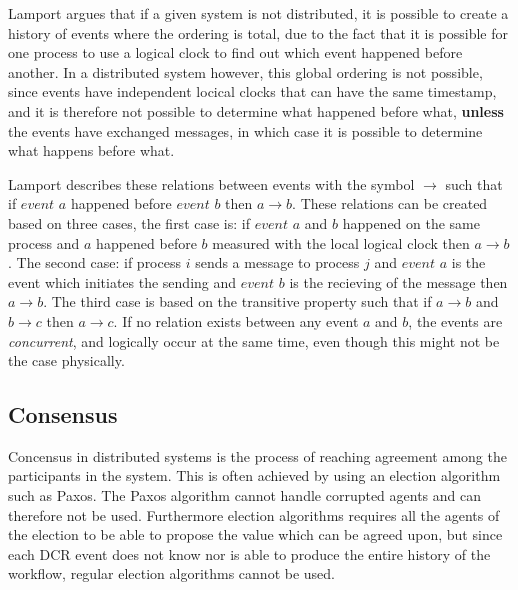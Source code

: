 		\newpar Lamport argues that if a given system is not distributed, it is possible to create a history of events where the ordering is total, due to the fact that it is possible for one process to use a logical clock to find out which event happened before another. In a distributed system however, this global ordering is not possible, since events have independent locical clocks that can have the same timestamp, and it is therefore not possible to determine what happened before what, \textbf{unless} the events have exchanged messages, in which case it is possible to determine what happens before what.
		
		\newpar Lamport describes these relations between events with the symbol $\rightarrow$ such that if $event$ $a$ happened before $event$ $b$ then $a \rightarrow b$. These relations can be created based on three cases, the first case is: if $event$ $a$ and $b$ happened on the same process and $a$ happened before $b$ measured with the local logical clock then $a \rightarrow b$. The second case: if process $i$ sends a message to process $j$ and $event$ $a$ is the event which initiates the sending and $event$ $b$ is the recieving of the message then $a \rightarrow b$. The third case is based on the transitive property such that if $a \rightarrow b$ and $b \rightarrow c$ then $a \rightarrow c$. If no relation exists between any event $a$ and $b$, the events are \textit{concurrent}, and logically  occur at the same time, even though this might not be the case physically. 
		
		
		\subsection{Consensus}
		Concensus in distributed systems is the process of reaching agreement among the participants in the system. This is often achieved by using an election algorithm such as Paxos\cite{Lamport:1998:PP:279227.279229}. The Paxos algorithm cannot handle corrupted agents and can therefore not be used. Furthermore election algorithms requires all the agents of the election to be able to propose the value which can be agreed upon, but since each DCR event does not know nor is able to produce the entire history of the workflow, regular election algorithms cannot be used.
		
